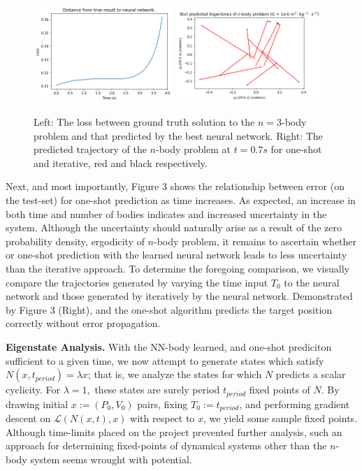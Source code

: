\documentclass{article}
\numberwithin{theorem}{section}
\numberwithin{equation}{section}
\def\scriptl{{\mathcal L}}
\begin{document}
\begin{figure}
	\begin{center}
		\includegraphics[width=0.47\textwidth]{download.png}
		\includegraphics[width=0.49\textwidth]{predicted.png}
	\end{center}
	\caption{Left: The loss between ground truth solution to the $n=3$-body problem and that predicted by the best neural network. Right: The predicted trajectory
	of the $n$-body problem at $t=0.7s$ for one-shot and iterative, red and black respectively.}
\end{figure}
 Next, and most importantly, Figure 3 shows the relationship between error (on the test-set) for one-shot prediction as time increases. As expected, an increase in both time and number of bodies indicates and increased uncertainty in the system. Although the uncertainty should naturally arise as a result of the zero probability density, ergodicity of $n$-body problem, it remains to ascertain whether or one-shot prediction with the learned neural network leads to less uncertainty than the iterative approach. To determine the foregoing comparison, we visually compare the trajectories generated by varying the time input $T_0$ to the neural network and those generated by iteratively by the neural network. Demonstrated by Figure 3 (Right), and the one-shot algorithm predicts the target position correctly without error propagation.

 \textbf{Eigenstate Analysis. } With the NN-body learned, and one-shot prediciton sufficient to a given time, we now attempt to generate states which satisfy $N(x, t_{period}) = \lambda x$; that is, we analyze the states for which $N$ predicts a scalar cyclicity. For $\lambda =1,$ these states are surely period $t_{period}$ fixed points of $N$. By drawing initial $x:=(P_0, V_0)$ pairs, fixing $T_0:=t_{period}$, and performing gradient descent on $\scriptl(N(x,t), x)$ with respect to $x$, we yield some sample fixed points. Although time-limits placed on the project prevented further analysis, such an approach for determining fixed-points of dynamical systems other than the $n$-body system seems wrought with potential.
% 
% 
% 
% 
% 
% 
\end{document}
